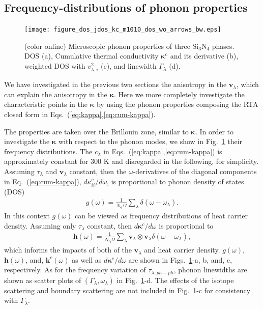 \documentclass[twocolumn,amsmath,amssymb,a4paper,prb,superscriptaddress,floatfix]{revtex4-1}
\begin{document}
\subsection{Frequency-distributions of phonon properties}

\begin{figure}[ht]
 \begin{center}
	 \texttt{[image: figure\_dos\_jdos\_kc\_m1010\_dos\_wo\_arrows\_bw.eps]}
  \caption{(color online) Microscopic phonon properties of three Si$_3$N$_4$
	  phases. DOS (a), Cumulative thermal conductivity $\mathbf{\kappa}^\text{c}$ and its derivative
	  (b), weighted DOS with $v_{\lambda,i}^2$ (c), and linewidth $\Gamma_\lambda$ (d).
  \label{fig:Fig5_338_rev} }
 \end{center}
\end{figure}

We have investigated in the previous two sections the anisotropy in the
$\mathbf{v}_\lambda$, which can explain the anisotropy in the
$\boldsymbol{\kappa}$. Here we more completely investigate the characteristic
points in the $\boldsymbol{\kappa}$ by using the phonon properties composing the
RTA closed form in Eqs.~(\ref{eq:kappa},\ref{eq:cum-kappa}). 

The properties are taken over the Brillouin zone, similar to
$\boldsymbol{\kappa}$.  In order to investigate the $\boldsymbol{\kappa}$ with
respect to the phonon modes, we show in Fig.~\ref{fig:Fig5_338_rev} their
frequency distributions.  The $c_\lambda$ in
Eqs.~(\ref{eq:kappa},\ref{eq:cum-kappa}) is approximately constant for 300 K and
disregarded in the following, for simplicity. Assuming $\tau_\lambda$ and
$\mathbf{v}_\lambda$ constant, then the $\omega$-derivatives of the diagonal
components in Eq.~(\ref{eq:cum-kappa}), $d\kappa_{ii}^c/d\omega$, is
proportional to phonon density of states (DOS)  
\begin{align}
 \label{eq:dos}
 g(\omega) = \frac{1}{N_\mathbf{q}\Omega}
 \sum_\lambda
 \delta(\omega-\omega_{\lambda}).
\end{align}
In this context $g(\omega)$ can be viewed as frequency distributions of heat
carrier density.  Assuming only $\tau_\lambda$ constant,
then $d\boldsymbol{\kappa}^c/d\omega$ is proportional to
\begin{align}
 \label{eq:wdos}
 \boldsymbol{h}(\omega) = \frac{1}{N_\mathbf{q}\Omega}
 \sum_\lambda
 \mathbf{v}_\lambda \otimes \mathbf{v}_\lambda
 \delta(\omega-\omega_{\lambda}),
\end{align}
which informs the impacts of both of the $\mathbf{v}_\lambda$ and heat carrier
density.  $g(\omega)$, $\boldsymbol{h}(\omega)$, and, $\boldsymbol{k}^c(\omega)$
as well as  $d\boldsymbol{\kappa}^c/d\omega$ are shown in
Figs.~\ref{fig:Fig5_338_rev}-a, b, and, c, respectively.  As for the frequency
variation of $\tau_{\lambda,ph-ph}$, phonon linewidths are shown as scatter plots of
$(\Gamma_\lambda,\omega_\lambda)$ in Fig.~\ref{fig:Fig5_338_rev}-d.  The effects
of the isotope scattering and boundary scattering are not included in
Fig.~\ref{fig:Fig5_338_rev}-c for consistency with $\Gamma_\lambda$.
\end{document}
